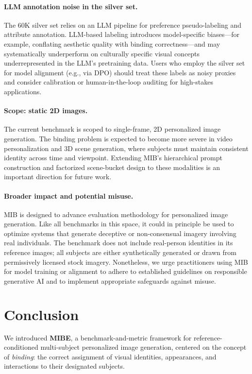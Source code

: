 \documentclass{article}
\begin{document}
\paragraph{LLM annotation noise in the silver set.}
The 60K silver set relies on an LLM pipeline for preference pseudo-labeling and attribute annotation.  
LLM-based labeling introduces model-specific biases—for example, conflating aesthetic quality with binding correctness—and may systematically underperform on culturally specific visual concepts underrepresented in the LLM's pretraining data.  
Users who employ the silver set for model alignment (e.g., via DPO) should treat these labels as noisy proxies and consider calibration or human-in-the-loop auditing for high-stakes applications.

\paragraph{Scope: static 2D images.}
The current benchmark is scoped to single-frame, 2D personalized image generation.  
The binding problem is expected to become more severe in video personalization and 3D scene generation, where subjects must maintain consistent identity across time and viewpoint.
Extending MIB's hierarchical prompt construction and factorized scene-bucket design to these modalities is an important direction for future work.

\paragraph{Broader impact and potential misuse.} MIB is designed to advance evaluation methodology for personalized image generation.  
Like all benchmarks in this space, it could in principle be used to optimize systems that generate deceptive or non-consensual imagery involving real individuals.  
The benchmark does not include real-person identities in its reference images; all subjects are either synthetically generated or drawn from permissively licensed stock imagery.  
Nonetheless, we urge practitioners using MIB for model training or alignment to adhere to established guidelines on responsible generative AI and to implement appropriate safeguards against misuse.


\section{Conclusion}
We introduced \textbf{MIBE}, a benchmark-and-metric framework for reference-conditioned multi-subject personalized image generation, centered on the concept of \emph{binding}: the correct assignment of visual identities, appearances, and interactions to their designated subjects.
\end{document}
